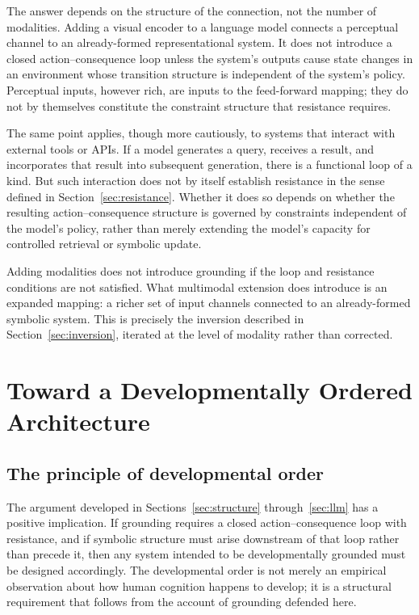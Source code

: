 \documentclass[11pt]{article}
\begin{document}
The answer depends on the structure of the connection, not the number
of modalities. Adding a visual encoder to a language model connects a
perceptual channel to an already-formed representational system. It
does not introduce a closed action--consequence loop unless the
system's outputs cause state changes in an environment whose
transition structure is independent of the system's policy. Perceptual
inputs, however rich, are inputs to the feed-forward mapping; they do
not by themselves constitute the constraint structure that resistance
requires.

The same point applies, though more cautiously, to systems that
interact with external tools or APIs. If a model generates a query,
receives a result, and incorporates that result into subsequent
generation, there is a functional loop of a kind. But such interaction
does not by itself establish resistance in the sense defined in
Section~\ref{sec:resistance}. Whether it does so depends on whether
the resulting action--consequence structure is governed by constraints
independent of the model's policy, rather than merely extending the
model's capacity for controlled retrieval or symbolic update.

Adding modalities does not introduce grounding if the loop and
resistance conditions are not satisfied. What multimodal extension
does introduce is an expanded mapping: a richer set of input channels
connected to an already-formed symbolic system. This is precisely the
inversion described in Section~\ref{sec:inversion}, iterated at the
level of modality rather than corrected.

\section{Toward a Developmentally Ordered Architecture}
\label{sec:arch}

\subsection{The principle of developmental order}
\label{sec:dev-order}

The argument developed in Sections~\ref{sec:structure}
through~\ref{sec:llm} has a positive implication. If grounding
requires a closed action--consequence loop with resistance, and if
symbolic structure must arise downstream of that loop rather than
precede it, then any system intended to be developmentally grounded
must be designed accordingly. The developmental order is not merely an
empirical observation about how human cognition happens to develop; it
is a structural requirement that follows from the account of grounding
defended here.
\end{document}
